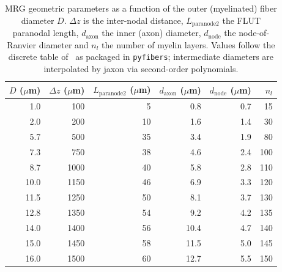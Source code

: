 \begin{table}[h]
  \centering
  \caption{MRG geometric parameters as a function of the outer (myelinated)
    fiber diameter $D$.  $\Delta z$ is the inter-nodal distance,
    $L_{\mathrm{paranode2}}$ the FLUT paranodal length, $d_{\mathrm{axon}}$
    the inner (axon) diameter, $d_{\mathrm{node}}$ the node-of-Ranvier
    diameter and $n_l$ the number of myelin layers.  Values follow the
    discrete table of~\cite{mcintyre2002} as packaged in
    \texttt{pyfibers}; intermediate diameters are interpolated by jaxon
    via second-order polynomials.}
  \label{tab:app-mrg-geom}
  \small
  \begin{tabular}{rrrrrr}
    \toprule
    $D$ ($\mu$m) & $\Delta z$ ($\mu$m) & $L_{\mathrm{paranode2}}$ ($\mu$m)
                 & $d_{\mathrm{axon}}$ ($\mu$m) & $d_{\mathrm{node}}$ ($\mu$m)
                 & $n_l$ \\
    \midrule
    1.0  &  100 &  5 &  0.8 & 0.7 &  15 \\
    2.0  &  200 & 10 &  1.6 & 1.4 &  30 \\
    5.7  &  500 & 35 &  3.4 & 1.9 &  80 \\
    7.3  &  750 & 38 &  4.6 & 2.4 & 100 \\
    8.7  & 1000 & 40 &  5.8 & 2.8 & 110 \\
    10.0 & 1150 & 46 &  6.9 & 3.3 & 120 \\
    11.5 & 1250 & 50 &  8.1 & 3.7 & 130 \\
    12.8 & 1350 & 54 &  9.2 & 4.2 & 135 \\
    14.0 & 1400 & 56 & 10.4 & 4.7 & 140 \\
    15.0 & 1450 & 58 & 11.5 & 5.0 & 145 \\
    16.0 & 1500 & 60 & 12.7 & 5.5 & 150 \\
    \bottomrule
  \end{tabular}
\end{table}

